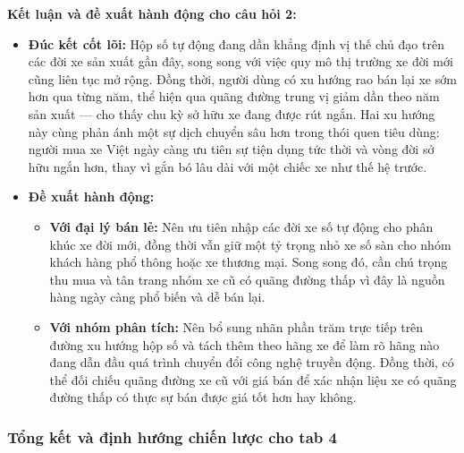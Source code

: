\noindent\textbf{Kết luận và đề xuất hành động cho câu hỏi 2:} 
\begin{itemize}
    \item \textbf{Đúc kết cốt lõi:} Hộp số tự động đang dần khẳng định vị thế chủ đạo trên các đời xe sản xuất gần đây, song song với việc quy mô thị trường xe đời mới cũng liên tục mở rộng. Đồng thời, người dùng có xu hướng rao bán lại xe sớm hơn qua từng năm, thể hiện qua quãng đường trung vị giảm dần theo năm sản xuất — cho thấy chu kỳ sở hữu xe đang được rút ngắn. Hai xu hướng này cùng phản ánh một sự dịch chuyển sâu hơn trong thói quen tiêu dùng: người mua xe Việt ngày càng ưu tiên sự tiện dụng tức thời và vòng đời sở hữu ngắn hơn, thay vì gắn bó lâu dài với một chiếc xe như thế hệ trước.
    \item \textbf{Đề xuất hành động:} 
    \begin{itemize}
        \item \textbf{Với đại lý bán lẻ:} Nên ưu tiên nhập các đời xe số tự động cho phân khúc xe đời mới, đồng thời vẫn giữ một tỷ trọng nhỏ xe số sàn cho nhóm khách hàng phổ thông hoặc xe thương mại. Song song đó, cần chú trọng thu mua và tân trang nhóm xe cũ có quãng đường thấp vì đây là nguồn hàng ngày càng phổ biến và dễ bán lại.
        \item \textbf{Với nhóm phân tích:} Nên bổ sung nhãn phần trăm trực tiếp trên đường xu hướng hộp số và tách thêm theo hãng xe để làm rõ hãng nào đang dẫn đầu quá trình chuyển đổi công nghệ truyền động. Đồng thời, có thể đối chiếu quãng đường xe cũ với giá bán để xác nhận liệu xe có quãng đường thấp có thực sự bán được giá tốt hơn hay không.
    \end{itemize}
\end{itemize}
\subsubsection{Tổng kết và định hướng chiến lược cho tab 4}
\label{subsubsec:tab4_summary}

